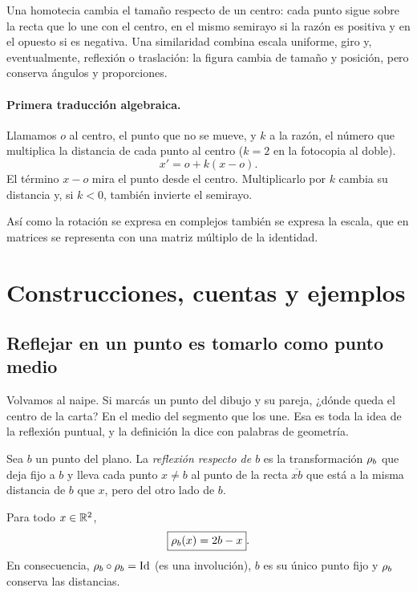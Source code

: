 Una homotecia cambia el tamaño respecto de un centro: cada punto sigue sobre la recta que lo
une con el centro, en el mismo semirayo si la razón es positiva y en el opuesto si es negativa.
Una similaridad combina escala uniforme, giro y, eventualmente, reflexión o traslación: la
figura cambia de tamaño y posición, pero conserva ángulos y proporciones.

\paragraph{Primera traducción algebraica.}
Llamamos \(o\) al centro, el punto que no se mueve, y \(k\) a la razón, el número que multiplica
la distancia de cada punto al centro (\(k=2\) en la fotocopia al doble).
\[
  x'=o+k(x-o).
\]
El término \(x-o\) mira el punto desde el centro. Multiplicarlo por \(k\) cambia su distancia
y, si \(k<0\), también invierte el semirayo.

\begin{idea}
Así como la rotación se expresa en complejos también se expresa la escala, que en
matrices se representa con una matriz múltiplo de la identidad.
\end{idea}

\section{Construcciones, cuentas y ejemplos}

\subsection{Reflejar en un punto es tomarlo como punto medio}\label{sec:refl-punto}

Volvamos al naipe. Si marcás un punto del dibujo y su pareja, ¿dónde queda el centro de la
carta? En el medio del segmento que los une. Esa es toda la idea de la reflexión puntual, y la
definición la dice con palabras de geometría.

\begin{definicion}\label{def:reflexion-puntual}
Sea \(b\) un punto del plano. La \emph{reflexión respecto de \(b\)} es la transformación
\(\rho_{b}\) que deja fijo a \(b\) y lleva cada punto \(x\neq b\) al punto de la recta
\(\overline{xb}\) que está a la misma distancia de \(b\) que \(x\), pero del otro lado de \(b\).
\end{definicion}

\begin{proposicion}\label{prop:reflexion-puntual}
Para todo \(x\in\mathbb{R}^2\),
\[
  \boxed{\rho_{b}(x)=2b-x}.
\]
En consecuencia, \(\rho_{b}\circ\rho_{b}=\operatorname{Id}\) (es una involución), \(b\) es su
único punto fijo y \(\rho_{b}\) conserva las distancias.
\end{proposicion}

